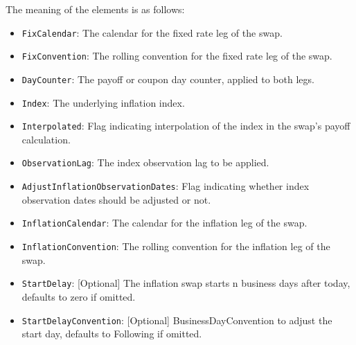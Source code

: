 The meaning of the elements is as follows:

\begin{itemize}
\item \lstinline!FixCalendar!: The calendar for the fixed rate leg of the swap.
\item \lstinline!FixConvention!: The rolling convention for the fixed rate leg of the swap.
\item \lstinline!DayCounter!: The payoff or coupon day counter, applied to both legs.
\item \lstinline!Index!: The underlying inflation index.
\item \lstinline!Interpolated!: Flag indicating interpolation of the index in the swap's payoff calculation.
\item \lstinline!ObservationLag!: The index observation lag to be applied.
\item \lstinline!AdjustInflationObservationDates!: Flag indicating whether index observation dates should be adjusted or not.
\item \lstinline!InflationCalendar!: The calendar for the inflation leg of the swap.
\item \lstinline!InflationConvention!: The rolling convention for the inflation leg of the swap.
\item \lstinline!StartDelay!: [Optional] The inflation swap starts n business days after today, defaults to zero if omitted.
\item \lstinline!StartDelayConvention!: [Optional] BusinessDayConvention to adjust the start day, defaults to Following if omitted.


\end{itemize}
